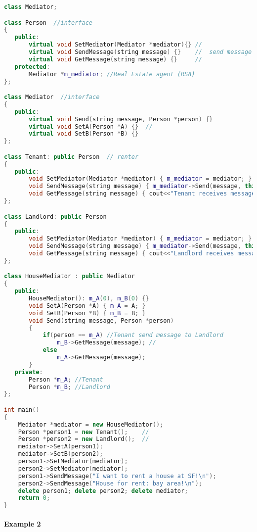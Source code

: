 \documentclass{book}
\begin{document}
\begin{lstlisting}[caption={Mediator Pattern Sample code}, language=C++]
class Mediator;  

class Person  //interface
{  
   public:  
       virtual void SetMediator(Mediator *mediator){} //
       virtual void SendMessage(string message) {}    //  send message to RSA
       virtual void GetMessage(string message) {}     //
   protected:  
       Mediator *m_mediator; //Real Estate agent (RSA)
};  

class Mediator  //interface
{  
   public:  
       virtual void Send(string message, Person *person) {}  
       virtual void SetA(Person *A) {}  //  
       virtual void SetB(Person *B) {}  
};  

class Tenant: public Person  // renter
{  
   public:  
       void SetMediator(Mediator *mediator) { m_mediator = mediator; }  
       void SendMessage(string message) { m_mediator->Send(message, this); }  
       void GetMessage(string message) { cout<<"Tenant receives message!"<<message; }  
};  

class Landlord: public Person  
{  
   public:  
       void SetMediator(Mediator *mediator) { m_mediator = mediator; }  
       void SendMessage(string message) { m_mediator->Send(message, this); }  
       void GetMessage(string message) { cout<<"Landlord receives message!"<<message; }  
};  

class HouseMediator : public Mediator  
{  
   public:  
       HouseMediator(): m_A(0), m_B(0) {}  
       void SetA(Person *A) { m_A = A; }  
       void SetB(Person *B) { m_B = B; }  
       void Send(string message, Person *person)   
       {  
           if(person == m_A) //Tenant send message to Landlord
               m_B->GetMessage(message); //  
           else  
               m_A->GetMessage(message);  
       }  
   private:  
       Person *m_A; //Tenant  
       Person *m_B; //Landlord 
};  

int main()  
{     
    Mediator *mediator = new HouseMediator();  
    Person *person1 = new Tenant();    //  
    Person *person2 = new Landlord();  //  
    mediator->SetA(person1);  
    mediator->SetB(person2);  
    person1->SetMediator(mediator);  
    person2->SetMediator(mediator);  
    person1->SendMessage("I want to rent a house at SF!\n");  
    person2->SendMessage("House for rent: bay area!\n");  
    delete person1; delete person2; delete mediator;  
    return 0;  
}  
\end{lstlisting}
\paragraph{Example 2}
\end{document}
